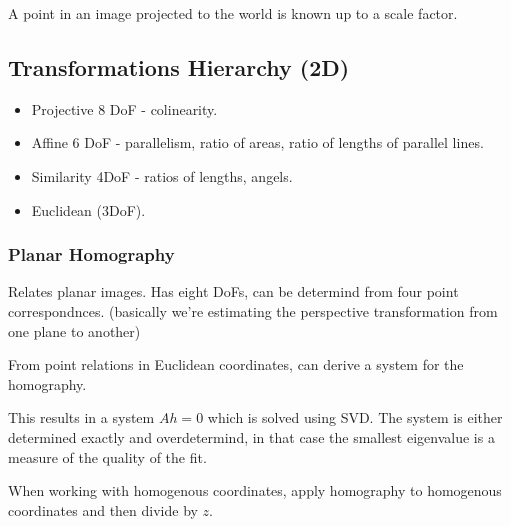 A point in an image projected to the world is known up to a scale factor.

\subsection{Transformations Hierarchy (2D)}

\begin{itemize}
\item Projective 8 DoF - colinearity.
\item Affine 6 DoF - parallelism, ratio of areas, ratio of lengths of parallel lines.
\item Similarity 4DoF - ratios of lengths, angels.
\item Euclidean (3DoF).
\end{itemize}



\subsubsection{Planar Homography}

Relates planar images. Has eight DoFs, can be determind from four point correspondnces.
(basically we're estimating the perspective transformation from one plane to another)

From point relations in Euclidean coordinates, can derive a system for the homography. 

This results in a system $Ah = 0$ which is solved using SVD. 
The system is either determined exactly and overdetermind, in that case the smallest eigenvalue is a measure of the quality of the fit.

When working with homogenous coordinates, apply homography to homogenous coordinates and then divide by $z$.


